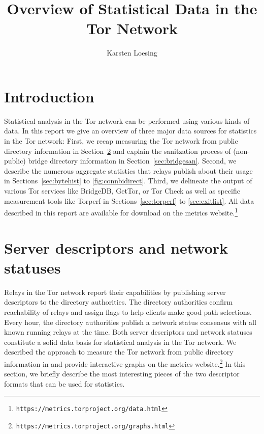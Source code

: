 \documentclass{article}
\begin{document}
\title{Overview of Statistical Data in the Tor Network}
\author{Karsten Loesing}
\maketitle

\section{Introduction}

Statistical analysis in the Tor network can be performed using various
kinds of data.
In this report we give an overview of three major data sources for
statistics in the Tor network:
First, we recap measuring the Tor network from public directory
information \cite{loesing2009measuring} in Section~\ref{sec:serverdesc}
and explain the sanitzation process of (non-public) bridge directory
information in Section~\ref{sec:bridgesan}.
Second, we describe the numerous aggregate statistics that relays publish
about their usage \cite{loesing2010case}
in Sections~\ref{sec:bytehist} to \ref{fig:connbidirect}.
Third, we delineate the output of various Tor services like BridgeDB,
GetTor, or
Tor Check as well as specific measurement tools like Torperf in
Sections~\ref{sec:torperf} to \ref{sec:exitlist}.
All data described in this report are available for download on the
metrics
website.\footnote{\texttt{https://metrics.torproject.org/data.html}}

\section{Server descriptors and network statuses}
\label{sec:serverdesc}

Relays in the Tor network report their capabilities by publishing server
descriptors to the directory authorities.
The directory authorities confirm reachability of relays and assign flags
to help clients make good path selections.
Every hour, the directory authorities publish a network status consensus
with all known running relays at the time.
Both server descriptors and network statuses constitute a solid data basis
for statistical analysis in the Tor network.
We described the approach to measure the Tor network from public directory
information in \cite{loesing2009measuring} and provide interactive
graphs on the metrics
website.\footnote{\texttt{https://metrics.torproject.org/graphs.html}}
In this section, we briefly describe the most interesting pieces of the
two descriptor formats that can be used for statistics.
\end{document}
